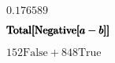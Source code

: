 \documentclass{article}
\begin{document}
\begin{doublespace}
\noindent\(0.176589\)
\end{doublespace}

\begin{doublespace}
\noindent\(\pmb{\text{Total}[}\\
\pmb{\text{Negative}[a-b]}\\
\pmb{]}\)
\end{doublespace}

\begin{doublespace}
\noindent\(152 \text{False}+848 \text{True}\)
\end{doublespace}

\begin{doublespace}
\noindent\(\pmb{\text{}}\)
\end{doublespace}
\end{document}
